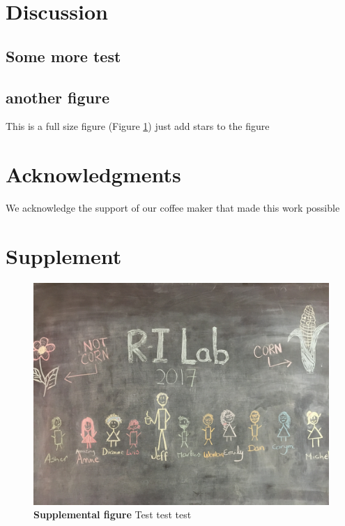 \documentclass[9pt,twocolumn,twoside]{rilabRxiv}
\newcommand{\beginsupplement}{%
        \setcounter{table}{0}
        \renewcommand{\thetable}{S\arabic{table}}%
        \setcounter{figure}{0}
        \renewcommand{\thefigure}{S\arabic{figure}}%
     }
\begin{document}
\section{Discussion}
\subsection{Some more test}
\blindtext
\blindtext


\subsection{another figure}
This is a full size figure (Figure \ref{fig:S1}) just add stars to the figure


\section{Acknowledgments}
We acknowledge the support of our coffee maker that made this work possible



\onecolumn
\section*{Supplement}


     
\beginsupplement


\blindtext
\begin{figure}[h!]
\includegraphics[width=.9\linewidth]{figures/lab_group.png}
\caption{\textbf{Supplemental figure} Test test test}
\label{fig:S1}
\end{figure}
\pagebreak
\end{document}
